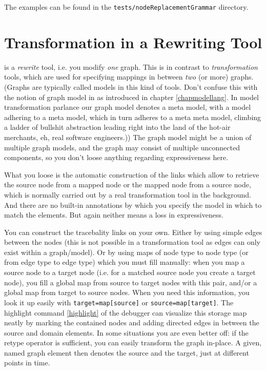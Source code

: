 The examples can be found in the \texttt{tests/nodeReplacementGrammar} directory.


\section{Transformation in a Rewriting Tool}\label{sec:transfo}
\GrG{} is a \emph{rewrite} tool, i.e. you modify \emph{one} graph.
This is in contrast to \emph{transformation} tools, which are used for specifying mappings in between \emph{two} (or more) graphs. (Graphs are typically called models in this kind of tools. Don't confuse this with the notion of graph model in \GrG as introduced in chapter \ref{chapmodellang}. In model transformation parlance our graph model denotes a meta model, with a model adhering to a meta model, which in turn adheres to a meta meta model, climbing a ladder of bullshit abstraction leading right into the land of the hot-air merchants, eh, real software engineers.))
The graph model might be a union of multiple graph models, and the graph may consist of multiple unconnected components, so you don't loose anything regarding expressiveness here.

What you loose is the automatic construction of the  links which allow to retrieve the source node from a mapped node or the mapped node from a source node, which is normally carried out by a real transformation tool in the background.
And there are no built-in annotations by which you specify the model in which to match the elements.
But again neither means a loss in expressiveness.

You can construct the tracebality links on your own.
Either by using simple edges between the nodes (this is not possible in a transformation tool as edges can only exist within a graph/model).
Or by using maps of node type to node type (or from edge type to edge type) which you must fill manually:
when you map a source node to a target node (i.e. for a matched source node you create a target node), you fill a global map from source to target nodes with this pair, and/or a global map from target to source nodes.
When you need this information, you look it up easily with \texttt{target=map[source]} or \texttt{source=map[target]}.
The highlight command \ref{highlight} of the debugger can visualize this storage map neatly by marking the contained nodes and adding directed edges in between the source and domain elements.
In some situations you are even better off: if the retype operator is sufficient, you can easily transform the graph in-place. A given, named graph element then denotes the source and the target, just at different points in time.

